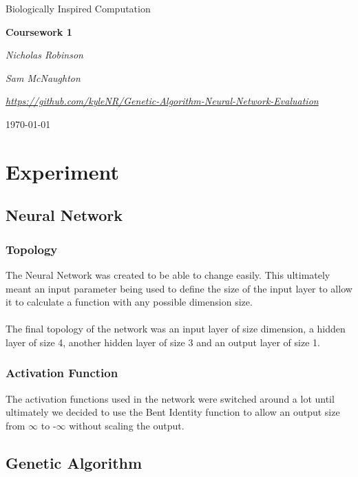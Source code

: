 \documentclass[12pt]{article}
\begin{document}

\begin{titlepage}
	\centering
	\vspace*{4cm}
	{\Large Biologically Inspired Computation \par}
	\vspace{2cm}
	{\huge\bfseries Coursework 1 \par}
	\vspace{2cm}
	{\Large\itshape Nicholas Robinson \par}
	{\Large\itshape Sam McNaughton \par}
	\vspace{2cm}
	{\Large\itshape\url{https://github.com/kyleNR/Genetic-Algorithm-Neural-Network-Evaluation} \par}
	\vfill
	{\large \today\par}
	\vspace{1cm}
\end{titlepage}

	\newpage
\section{Experiment}
\subsection{Neural Network}
\subsubsection{Topology}
The Neural Network was created to be able to change easily. This ultimately meant an input parameter being used to define the size of the input layer to allow it to calculate a function with any possible dimension size.\\\\
The final topology of the network was an input layer of size dimension, a hidden layer of size 4, another hidden layer of size 3 and an output layer of size 1.

\subsubsection{Activation Function}
The activation functions used in the network were switched around a lot until ultimately we decided to use the Bent Identity function to allow an output size from $\infty$ to -$\infty$ without scaling the output. 

\subsection{Genetic Algorithm}
\end{document}
